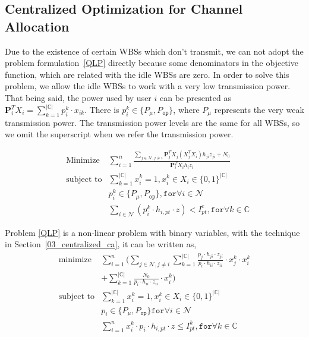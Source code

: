 \documentclass[times]{ettauth}
\theoremstyle{mytheoremstyle}
\theoremstyle{mytheoremstyle}
\theoremstyle{mytheoremstyle}
\renewcommand{\vec}[1]{\mathbf{#1}}
\begin{document}
\subsection{Centralized Optimization for Channel Allocation}
Due to the existence of certain WBSs which don't transmit, we can not adopt the problem formulation~\ref{QLP} directly because some denominators in the objective function, which are related with the idle WBSs are zero.
In order to solve this problem, we allow the idle WBSs to work with a very low transmission power.
That being said, the power used by user $i$ can be presented as $\vec{P}_i^T X_i = \sum\limits_{k=1}^{|\mathbb{C}|}p_i^k\cdot x_{ik}$.
There is $p_i^k\in \{P_\mu, P_{\mathtt{op}}\}$, where $P_\mu$ represents the very weak transmission power.
The transmission power levels are the same for all WBSs, so we omit the superscript when we refer the transmission power.

	\begin{equation}
\label{QLP}
		\begin{aligned}
		& \underset{}{\text{Minimize}}
		&  \sum\limits^{n}_{i=1} \frac{\sum\limits_{j\in\mathcal{N}, j\neq i}\vec{P}_j^TX_j(X_j^TX_i)h_{ji}z_{ji} + N_0}{\vec{P}_i^TX_ih_iz_i}\\
		& \text{subject to}
		&  \sum\limits_{k=1}^{|\mathbb{C}|}x_i^k=1, x_i^k\in X_i\in \{0,1\}^{|\mathbb{C}|}\\
		& & p_i^k\in \{P_\mu, P_{\mathtt{op}}\}, \mathtt{for} \forall i\in \mathcal{N}\\
     	& & \sum_{i\in \mathcal{N}} (p^k_i \cdot h_{i,pt}\cdot z) < I^c_{pt},  \mathtt{for} \forall k\in \mathbb{C} 
		\end{aligned}
	\end{equation}
	
Problem \ref{QLP} is a non-linear problem with binary variables, with the technique in Section~\ref{03_centralized_ca}, it can be written as,
	\begin{equation}
\label{QLP_2}
			\begin{aligned}
			\underset{}{\text{minimize}}
			& \sum\limits^{n}_{i=1} ( \sum\limits_{j\in\mathcal{N}, j\neq i}\sum\limits_{k=1}^{|\mathbb{C}|} \frac{p_j\cdot h_{ji}\cdot z_{ji}}{p_i\cdot h_{ii}\cdot z_{ii}}\cdot  x_j^k\cdot x_i^k  \\
			& + \sum\limits_{k=1}^{|\mathbb{C}|} \frac{N_0}{p_i\cdot h_{ii}\cdot z_{ii}}\cdot x_i^k)\\
			\text{subject to} 
			& \sum\limits_{k=1}^{|\mathbb{C}|}x_i^k=1, x_i^k\in X_i\in \{0,1\}^{|\mathbb{C}|}\\
			& p_i\in \{P_\mu, P_{\mathtt{op}}\} \mathtt{for} \forall i\in \mathcal{N}\\
			& \sum\limits^{n}_{i=1}x_i^k\cdot p_i\cdot h_{i,pt}\cdot z \leq I^k_{pt}, \mathtt{for}\forall k\in \mathbb{C} \\
			\end{aligned}
		\end{equation}
		
\end{document}
